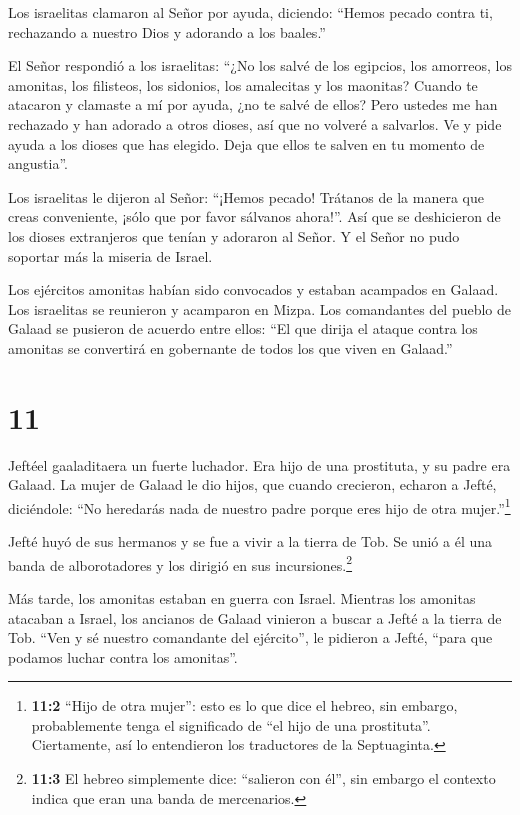  Los israelitas clamaron al Señor por ayuda, diciendo:
``Hemos pecado contra ti, rechazando a nuestro Dios y adorando a los
baales.''

 El Señor respondió a los israelitas: ``¿No los salvé de
los egipcios, los amorreos, los amonitas, los filisteos, 
los sidonios, los amalecitas y los maonitas? Cuando te atacaron y
clamaste a mí por ayuda, ¿no te salvé de ellos?  Pero
ustedes me han rechazado y han adorado a otros dioses, así que no
volveré a salvarlos.  Ve y pide ayuda a los dioses que has
elegido. Deja que ellos te salven en tu momento de angustia''.

 Los israelitas le dijeron al Señor: ``¡Hemos pecado!
Trátanos de la manera que creas conveniente, ¡sólo que por favor
sálvanos ahora!''.  Así que se deshicieron de los dioses
extranjeros que tenían y adoraron al Señor. Y el Señor no pudo soportar
más la miseria de Israel.

 Los ejércitos amonitas habían sido convocados y estaban
acampados en Galaad. Los israelitas se reunieron y acamparon en Mizpa.
 Los comandantes del pueblo de Galaad se pusieron de
acuerdo entre ellos: ``El que dirija el ataque contra los amonitas se
convertirá en gobernante de todos los que viven en Galaad.''

\hypertarget{section-10}{%
\section{11}\label{section-10}}

 Jeftéel gaaladitaera un fuerte luchador. Era hijo de una
prostituta, y su padre era Galaad.  La mujer de Galaad le
dio hijos, que cuando crecieron, echaron a Jefté, diciéndole: ``No
heredarás nada de nuestro padre porque eres hijo de otra
mujer.''\footnote{\textbf{11:2} ``Hijo de otra mujer'': esto es lo que
  dice el hebreo, sin embargo, probablemente tenga el significado de
  ``el hijo de una prostituta''. Ciertamente, así lo entendieron los
  traductores de la Septuaginta.}

 Jefté huyó de sus hermanos y se fue a vivir a la tierra de
Tob. Se unió a él una banda de alborotadores y los dirigió en sus
incursiones.\footnote{\textbf{11:3} El hebreo simplemente dice:
  ``salieron con él'', sin embargo el contexto indica que eran una banda
  de mercenarios.}

 Más tarde, los amonitas estaban en guerra con Israel.
 Mientras los amonitas atacaban a Israel, los ancianos de
Galaad vinieron a buscar a Jefté a la tierra de Tob.  ``Ven
y sé nuestro comandante del ejército'', le pidieron a Jefté, ``para que
podamos luchar contra los amonitas''.


